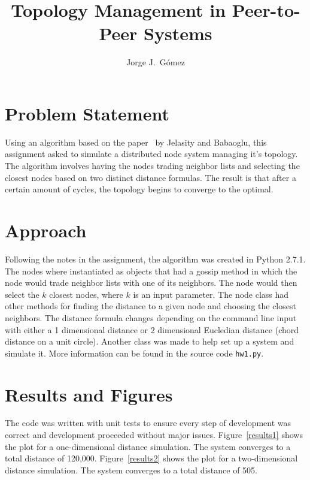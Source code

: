 \documentclass{article}
\begin{document}
\title{Topology Management in Peer-to-Peer Systems}
\author{Jorge J.~G\'omez}

\maketitle
\section{Problem Statement}
  Using an algorithm based on the paper~\cite{t-man} by Jelasity and
  Babaoglu, this assignment asked to simulate a distributed node system
  managing it's topology. The algorithm involves having the nodes
  trading neighbor lists and selecting the closest nodes based on two
  distinct distance formulas. The result is that after a certain amount
  of cycles, the topology begins to converge to the optimal.
\section{Approach}
  Following the notes in the assignment, the algorithm was created in
  Python 2.7.1. The nodes where instantiated as objects that had a
  gossip method in which the node would trade neighbor lists with one of
  its neighbors. The node would then select the $k$ closest nodes, where
  $k$ is an input parameter. The node class had other methods for
  finding the distance to a given node and choosing the closest
  neighbors.  The distance formula changes depending on the command line
  input with either a 1 dimensional distance or 2 dimensional Eucledian
  distance (chord distance on a unit circle).  Another class was made to
  help set up a system and simulate it.  More information can be found
  in the source code
  \texttt{hw1.py}.
\section{Results and Figures}
  The code was written with unit tests to ensure every step of
  development was correct and development proceeded without major
  issues.  Figure~\ref{results1} shows the plot for a one-dimensional
  distance simulation. The system converges to a total distance of
  120,000. Figure~\ref{results2} shows the plot for a two-dimensional
  distance simulation. The system converges to a total distance of 505.
\end{document}
